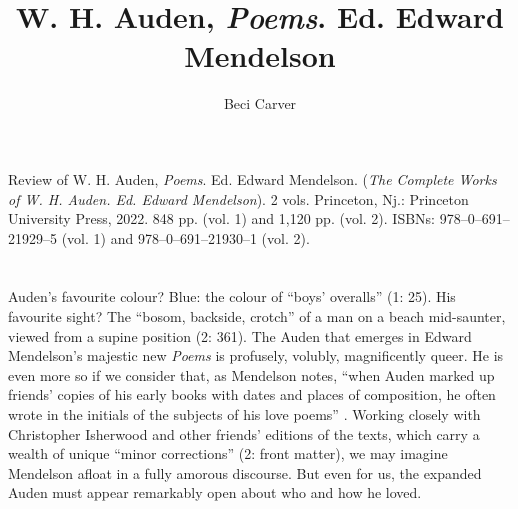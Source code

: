 \documentclass{article}
\author{Beci Carver}
\title{W. H. Auden, \emph{Poems}. Ed. Edward Mendelson}
\begin{document}
\maketitle


\begin{reviewed}
Review of W. H. Auden, \emph{Poems}. Ed. Edward Mendelson. (\textit{The Complete Works of W. H. Auden. \emph{Ed. Edward Mendelson}}). 2 vols. Princeton, Nj.: Princeton University Press, 2022. 848 pp. (vol. 1) and 1,120 pp. (vol. 2). ISBNs: 978–0–691–21929–5 (vol. 1) and 978–0–691–21930–1 (vol. 2).
\end{reviewed}


\section*{} 
Auden's favourite colour? Blue: the colour of ``boys' overalls'' (1:
25). His favourite sight? The ``bosom, backside, crotch'' of a man on a
beach mid-saunter, viewed from a supine position (2: 361). The Auden
that emerges in Edward Mendelson's majestic new \emph{Poems} is
profusely, volubly, magnificently queer. He is even more so if we
consider that, as Mendelson notes, ``when Auden marked up friends'
copies of his early books with dates and places of composition, he often
wrote in the initials of the subjects of his love poems'' \parencite[43]{mendelson_early_2017}. Working closely with Christopher Isherwood and other friends'
editions of the texts, which carry a wealth of unique ``minor
corrections'' (2: front matter), we may imagine Mendelson afloat in a
fully amorous discourse. But even for us, the expanded Auden must appear
remarkably open about who and how he loved.
\end{document}
